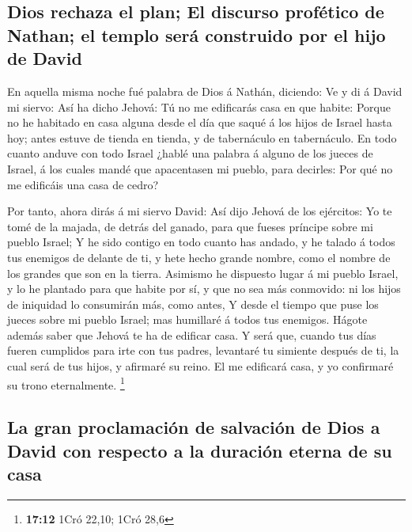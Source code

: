 \hypertarget{dios-rechaza-el-plan-el-discurso-profuxe9tico-de-nathan-el-templo-seruxe1-construido-por-el-hijo-de-david}{%
\subsection{Dios rechaza el plan; El discurso profético de Nathan; el
templo será construido por el hijo de
David}\label{dios-rechaza-el-plan-el-discurso-profuxe9tico-de-nathan-el-templo-seruxe1-construido-por-el-hijo-de-david}}

 En aquella misma noche fué palabra de Dios á Nathán,
diciendo:  Ve y di á David mi siervo: Así ha dicho Jehová:
Tú no me edificarás casa en que habite:  Porque no he
habitado en casa alguna desde el día que saqué á los hijos de Israel
hasta hoy; antes estuve de tienda en tienda, y de tabernáculo en
tabernáculo.  En todo cuanto anduve con todo Israel ¿hablé
una palabra á alguno de los jueces de Israel, á los cuales mandé que
apacentasen mi pueblo, para decirles: Por qué no me edificáis una casa
de cedro?

 Por tanto, ahora dirás á mi siervo David: Así dijo Jehová
de los ejércitos: Yo te tomé de la majada, de detrás del ganado, para
que fueses príncipe sobre mi pueblo Israel;  Y he sido
contigo en todo cuanto has andado, y he talado á todos tus enemigos de
delante de ti, y hete hecho grande nombre, como el nombre de los grandes
que son en la tierra.  Asimismo he dispuesto lugar á mi
pueblo Israel, y lo he plantado para que habite por sí, y que no sea más
conmovido: ni los hijos de iniquidad lo consumirán más, como antes,
 Y desde el tiempo que puse los jueces sobre mi pueblo
Israel; mas humillaré á todos tus enemigos. Hágote además saber que
Jehová te ha de edificar casa.  Y será que, cuando tus
días fueren cumplidos para irte con tus padres, levantaré tu simiente
después de ti, la cual será de tus hijos, y afirmaré su reino.
 El me edificará casa, y yo confirmaré su trono
eternalmente. \footnote{\textbf{17:12} 1Cró 22,10; 1Cró 28,6}

\hypertarget{la-gran-proclamaciuxf3n-de-salvaciuxf3n-de-dios-a-david-con-respecto-a-la-duraciuxf3n-eterna-de-su-casa}{%
\subsection{La gran proclamación de salvación de Dios a David con
respecto a la duración eterna de su
casa}\label{la-gran-proclamaciuxf3n-de-salvaciuxf3n-de-dios-a-david-con-respecto-a-la-duraciuxf3n-eterna-de-su-casa}}

